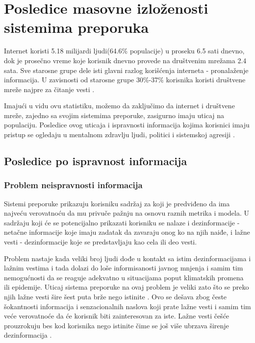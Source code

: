 \documentclass[a4paper]{article}
\begin{document}
\section{Posledice masovne izloženosti sistemima preporuka}
\label{sec:posledice_masovne_izloženosti 1}


Internet koristi 5.18 milijardi ljudi(64.6\% populacije) u proseku 6.5 sati dnevno, dok je prosečno vreme koje korisnik dnevno provede na društvenim mrežama 2.4 sata. Sve starosne grupe dele isti glavni razlog korišćenja interneta - pronalaženje informacija. U zavisnosti od starosne grupe 30\%-37\% korisnika koristi društvene mreže najpre za čitanje vesti \cite{Kemp_2023}.

Imajući u vidu ovu statistiku, možemo da zaključimo da internet i društvene mreže, zajedno sa svojim sistemima preporuke, zasigurno imaju uticaj na populaciju. Posledice ovog uticaja i ispravnosti informacija kojima korisnici imaju pristup se ogledaju u mentalnom zdravlju ljudi, politici i sistemskoj agresiji \cite{Ledger_of_Harms}.


\subsection{Posledice po ispravnost informacija}
\label{subsec: posledice_informacije 1}


\subsubsection{Problem neispravnosti informacija}
\label{subsec: problem_informacije 1}


Sistemi preporuke prikazuju korisniku sadržaj za koji je predviđeno da ima najveću verovatnoću da mu privuče pažnju na osnovu raznih metrika i modela. U sadržaju koji će se potencijalno prikazati korisniku se nalaze i dezinformacije - netačne informacije koje imaju zadatak da zavaraju onog ko na njih naiđe, i lažne vesti - dezinformacije koje se predstavljaju kao cela ili deo vesti.

Problem nastaje kada veliki broj ljudi dođe u kontakt sa istim dezinformacijama i lažnim vestima i tada dolazi do loše informisanosti javnog mnjenja i samim tim nemogućnosti da se reaguje adekvatno u situacijama poput klimatskih promena ili epidemije. Uticaj sistema preporuke na ovaj problem je veliki zato što se preko njih lažne vesti šire šest puta brže nego istinite \cite{Vosoughi_Roy_Aral_2018}. Ovo se dešava zbog česte šokantnosti informacija i senzacionalnih naslova koji prate lažne vesti i samim tim veće verovatnoće da će korisnik biti zainteresovan za iste.
Lažne vesti češće prouzrokuju bes kod korisnika nego istinite \cite{Lu_2020} čime se još više ubrzava širenje dezinformacija \cite{Vosoughi_Roy_Aral_2018}.
\end{document}
